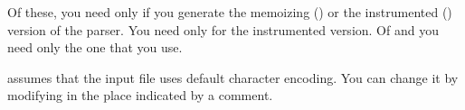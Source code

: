 Of these, you need  only if you generate the memoizing ()
or the instrumented () version of the parser.
You need  only for the instrumented version.
Of  and  you need only the one that you use.

 assumes that the input file uses default character encoding.
You can change it by modifying  in the place
indicated by a comment.

